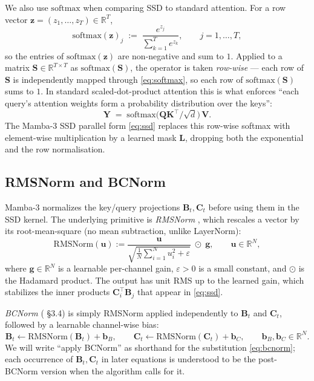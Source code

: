 \documentclass[11pt,a4paper]{article}
\begin{document}
We also use $\mathrm{softmax}$ when comparing SSD to standard
attention. For a row vector $\bm{z}=(z_1,\dots,z_T)\in\mathbb{R}^{T}$,
\begin{equation}\label{eq:softmax}
  \mathrm{softmax}(\bm{z})_j \;:=\; \frac{e^{z_j}}{\sum_{k=1}^{T} e^{z_k}},
  \qquad j=1,\dots,T,
\end{equation}
so the entries of $\mathrm{softmax}(\bm{z})$ are non-negative and sum
to $1$. Applied to a matrix
$\bm{S}\in\mathbb{R}^{T\times T}$ as $\mathrm{softmax}(\bm{S})$, the
operator is taken \emph{row-wise} — each row of $\bm{S}$ is independently
mapped through \eqref{eq:softmax}, so each row of
$\mathrm{softmax}(\bm{S})$ sums to $1$. In standard scaled-dot-product
attention this is what enforces ``each query's attention weights form
a probability distribution over the keys'':
\[
  \bm{Y} \;=\; \mathrm{softmax}\!\bigl(\bm{Q}\bm{K}^\top/\sqrt{d}\bigr)\,\bm{V}.
\]
The Mamba-3 SSD parallel form \eqref{eq:ssd} replaces this row-wise
softmax with element-wise multiplication by a learned mask
$\bm{L}$, dropping both the exponential and the row normalisation.

\subsection{RMSNorm and BCNorm}
\label{sec:bcnorm}

Mamba-3 normalizes the key/query projections $\bm{B}_t,\bm{C}_t$ before
using them in the SSD kernel. The underlying primitive is
\emph{RMSNorm} \cite{rmsnorm}, which rescales a vector by its
root-mean-square (no mean subtraction, unlike LayerNorm):
\begin{equation}\label{eq:rmsnorm}
  \mathrm{RMSNorm}(\bm{u}) := \frac{\bm{u}}{\sqrt{\tfrac{1}{N}\sum_{i=1}^{N} u_i^{2} + \varepsilon}}\;\odot\;\bm{g},
  \qquad \bm{u}\in\mathbb{R}^{N},
\end{equation}
where $\bm{g}\in\mathbb{R}^{N}$ is a learnable per-channel gain,
$\varepsilon>0$ is a small constant, and $\odot$ is the Hadamard
product. The output has unit RMS up to the learned gain, which
stabilizes the inner products $\bm{C}_i^\top\bm{B}_j$ that appear in
\eqref{eq:ssd}.

\emph{BCNorm} (\cite{mamba3} \S 3.4) is simply RMSNorm applied
independently to $\bm{B}_t$ and $\bm{C}_t$, followed by a learnable
channel-wise bias:
\begin{equation}\label{eq:bcnorm}
  \bm{B}_t \leftarrow \mathrm{RMSNorm}(\bm{B}_t) + \bm{b}_B,
  \qquad
  \bm{C}_t \leftarrow \mathrm{RMSNorm}(\bm{C}_t) + \bm{b}_C,
  \qquad \bm{b}_B,\bm{b}_C \in \mathbb{R}^{N}.
\end{equation}
We will write ``apply BCNorm'' as shorthand for the substitution
\eqref{eq:bcnorm}; each occurrence of $\bm{B}_t,\bm{C}_t$ in later
equations is understood to be the post-BCNorm version when the
algorithm calls for it.
\end{document}
